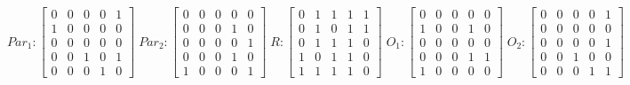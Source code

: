      $$
        Par_{1} : \begin{bmatrix}
            0 & 0 & 0 & 0 & 1 \\
            1 & 0 & 0 & 0 & 0 \\
            0 & 0 & 0 & 0 & 0 \\
			0 & 0 & 1 & 0 & 1 \\
            0 & 0 & 0 & 1 & 0 
        \end{bmatrix}
        \;
        Par_{2} : \begin{bmatrix}
            0 & 0 & 0 & 0 & 0 \\
            0 & 0 & 0 & 1 & 0 \\
            0 & 0 & 0 & 0 & 1 \\
            0 & 0 & 0 & 1 & 0 \\
            1 & 0 & 0 & 0 & 1
        \end{bmatrix}
        \;
        R : \begin{bmatrix}
            0 & 1 & 1 & 1 & 1 \\
            0 & 1 & 0 & 1 & 1 \\
            0 & 1 & 1 & 1 & 0 \\
            1 & 0 & 1 & 1 & 0 \\
            1 & 1 & 1 & 1 & 0
        \end{bmatrix}
        \;
        O_{1} : \begin{bmatrix}
            0 & 0 & 0 & 0 & 0 \\
            1 & 0 & 0 & 1 & 0 \\
            0 & 0 & 0 & 0 & 0 \\
            0 & 0 & 0 & 1 & 1 \\
            1 & 0 & 0 & 0 & 0
        \end{bmatrix}
        \;
        O_{2} : \begin{bmatrix}
            0 & 0 & 0 & 0 & 1 \\
            0 & 0 & 0 & 0 & 0 \\
            0 & 0 & 0 & 0 & 1 \\
            0 & 0 & 1 & 0 & 0 \\
            0 & 0 & 0 & 1 & 1
        \end{bmatrix}
    $$ 
